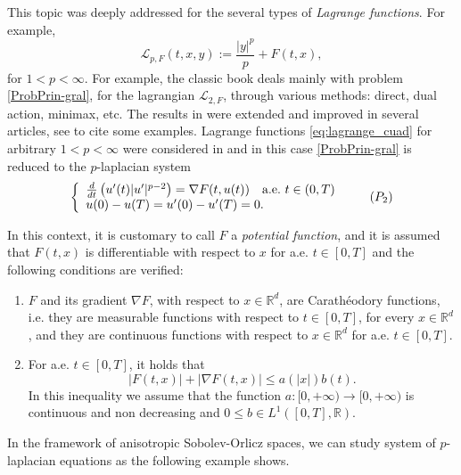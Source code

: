 \documentclass[twoside]{article}
\makeatletter
\theoremstyle{remark}
\newcommand{\labitem}[2]{%
\def\@itemlabel{\textbf{#1}}
\item
\def\@currentlabel{#1}\label{#2}}
\newcommand{\rr}{\mathbb{R}}
\renewcommand{\leq}{\leqslant}
\newcounter{example}
\makeatother
\begin{document}
This topic was deeply addressed for the several types of \emph{Lagrange functions}.  For example,
\begin{equation}\label{eq:lagrange_cuad}
\mathcal{L}_{p,F}(t,x,y):=\frac{|y|^p}{p}+F(t,x),
\end{equation}
for $1<p<\infty$. For example, the classic book  \cite{mawhin2010critical} deals mainly with problem \eqref{ProbPrin-gral}, for the lagrangian $\mathcal{L}_{2,F}$, through various methods: direct, dual action, minimax, etc. The results in \cite{mawhin2010critical} were extended and improved in several articles,  see  \cite{tang1995periodic,tang1998periodic,wu1999periodic,tang2001periodic,zhao2004periodic}  to cite some examples. Lagrange functions \eqref{eq:lagrange_cuad} for arbitrary $1<p<\infty$ were considered in  \cite{Tian2007192,tang2010periodic} and in this case \eqref{ProbPrin-gral}  is reduced to the $p$-laplacian system
\begin{equation}\label{ProbP-lapla}
    \left\{%
\begin{array}{ll}
   \frac{d}{dt}\left(u'(t)|u'|^{p-2}\right) = \nabla F(t,u(t)) \quad \hbox{a.e.}\ t \in (0,T)\\
    u(0)-u(T)=u'(0)-u'(T)=0.
\end{array}%
\right.\tag{$P_2$}
\end{equation}


In this context, it  is customary to call $F$ a  \emph{potential function}, and it is assumed that $F(t,x)$ is differentiable with respect to $x$ for a.e. $t\in [0,T]$ and the following conditions are verified:
\begin{enumerate}
\labitem{(C)}{item:condicion_c} $F$ and its gradient $\nabla F$, with respect to $x\in\rr^d$,  are  Carath\'eodory functions, i.e. they are measurable functions with respect to $t\in [0,T]$, for every  $x\in\rr^d$, and they are continuous functions with  respect to  $x\in\rr^d$ for a.e. $t \in [0,T]$.
 \labitem{(A)}{item:condicion_a}  For   a.e. $t\in [0,T]$, it holds that
\begin{equation}
|F(t,x)| + |\nabla F(t,x)|  \leq a(|x|)b(t).
\end{equation}
In this inequality we assume that the function  $a:[0,+\infty)\to [0,+\infty)$ is continuous and non decreasing and $0\leq b\in L^1([0,T],\rr)$.
\end{enumerate}


In the framework of anisotropic Sobolev-Orlicz spaces, we can study system of $p$-laplacian equations as the following example shows.
\end{document}
